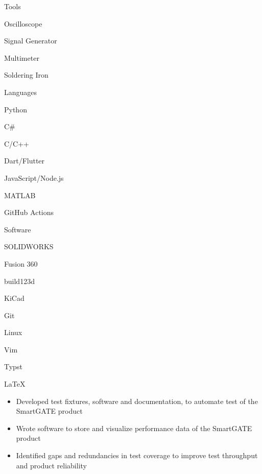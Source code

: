\documentclass{resume}
\author{Jasper Chan}
\begin{document}
\maketitle

\vspace{-1em} %
\TechnicalSkills

\begin{TechSkills}{Tools}
    \item Oscilloscope
    \item Signal Generator
    \item Multimeter
    \item Soldering Iron
\end{TechSkills}
\begin{TechSkills}{Languages}
    \item Python
    \item C\#
    \item C/C++
    \item Dart/Flutter
    \item JavaScript/Node.js
    \item MATLAB
    \item GitHub Actions
\end{TechSkills}
\begin{TechSkills}{Software}
    \item SOLIDWORKS
    \item Fusion 360
    \item build123d
    \item KiCad
    \item Git
    \item Linux
    \item Vim
    \item Typst
    \item \LaTeX
\end{TechSkills}

\WorkExperience

\begin{itemize}
    \item Developed test fixtures, software and documentation, to automate test of the SmartGATE product
    \item Wrote software to store and visualize performance data of the SmartGATE product
    \item Identified gaps and redundancies in test coverage to improve test throughput and product reliability
\end{itemize}
\end{document}
